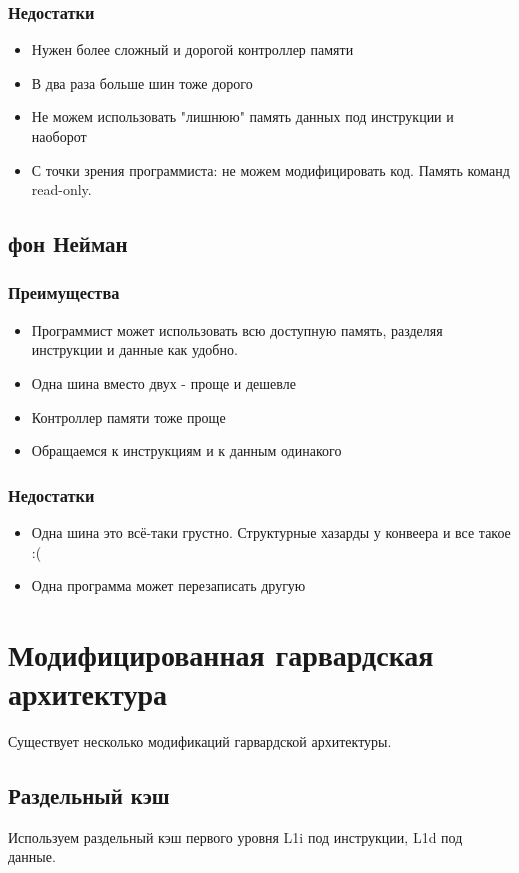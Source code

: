 \documentclass[12pt, a4paper]{article}
\begin{document}
\subsubsection{Недостатки}
\begin{itemize}
    \item Нужен более сложный и дорогой контроллер памяти
    \item В два раза больше шин тоже дорого
    \item Не можем использовать "лишнюю" память данных под инструкции и наоборот
    \item С точки зрения программиста: не можем модифицировать код. Память команд read-only.
\end{itemize}
\subsection{фон Нейман}
\subsubsection{Преимущества}
\begin{itemize}
    \item Программист может использовать всю доступную память, разделяя инструкции и данные как удобно.
    \item Одна шина вместо двух - проще и дешевле
    \item Контроллер памяти тоже проще
    \item Обращаемся к инструкциям и к данным одинакого
\end{itemize}
\subsubsection{Недостатки}
\begin{itemize}
    \item Одна шина это всё-таки грустно. Структурные хазарды у конвеера и все такое :(
    \item Одна программа может перезаписать другую
\end{itemize}
\section{Модифицированная гарвардская архитектура}
Существует несколько модификаций гарвардской архитектуры.
\subsection{Раздельный кэш}
Используем раздельный кэш первого уровня L1i под инструкции, L1d под данные.
\end{document}
